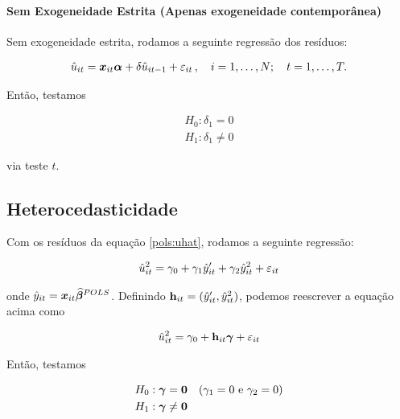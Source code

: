 \documentclass[11pt, oneside, a4paper, article]{article}
\numberwithin{equation}{section}
\begin{document}
\paragraph{Sem Exogeneidade Estrita (Apenas exogeneidade contemporânea)}
Sem exogeneidade estrita, rodamos a seguinte regressão dos resíduos:

\vspace{-1.5 em}
\begin{align*}
	\hat{u}_{it} = \boldsymbol{x}_{it} \boldsymbol{\alpha} + \delta \hat{u}_{it-1}  + \varepsilon_{it}
	\, , \quad i=1,\dots, N; \quad t=1,\dots, T.
\end{align*}

\noindent
Então, testamos

\vspace{-1 em}
\begin{align*}
H_{0} : \delta_{1} = 0
\\
H_{1} : \delta_{1} \neq 0
\end{align*}

\noindent
via teste $t$. 

\subsection{Heterocedasticidade}
Com os resíduos da equação \eqref{pols:uhat}, rodamos a seguinte regressão:

\vspace{-1 em}
\begin{align*}
	\hat{u}^{2}_{it} = \gamma_{0} + \gamma_{1} \hat{y}_{it}' + \gamma_{2} \hat{y}^{2}_{it} + \varepsilon_{it}
\end{align*}

\noindent
onde $\hat{y}_{it} = \boldsymbol{x}_{it} \widehat{\boldsymbol{\beta}}^{POLS}$.
Definindo $\mathbf{h}_{it} = ( \hat{y}_{it}', \hat{y}^{2}_{it} )$, podemos reescrever a equação acima como

\vspace{-1 em}
\begin{align*}
	\hat{u}^{2}_{it} = \gamma_{0} + \mathbf{h}_{it} \boldsymbol{\gamma} + \varepsilon_{it}
\end{align*}

\noindent
Então, testamos

\vspace{-1 em}
\begin{align*}
H_{0} &: \boldsymbol{\gamma} = \boldsymbol{0} \quad (\gamma_{1} = 0 \text{ e } \gamma_{2} = 0 )
\\
H_{1} &: \boldsymbol{\gamma} \neq \boldsymbol{0}
\end{align*}
\end{document}
